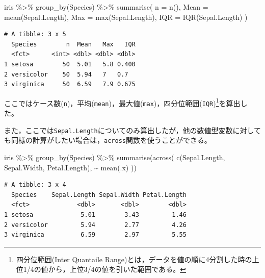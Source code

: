 \documentclass[
  a4paper,
]{ltjsbook}
\newenvironment{Shaded}{\begin{snugshade}}{\end{snugshade}}
\newcommand{\AttributeTok}[1]{\textcolor[rgb]{0.40,0.45,0.13}{#1}}
\newcommand{\FunctionTok}[1]{\textcolor[rgb]{0.28,0.35,0.67}{#1}}
\newcommand{\NormalTok}[1]{\textcolor[rgb]{0.00,0.23,0.31}{#1}}
\newcommand{\SpecialCharTok}[1]{\textcolor[rgb]{0.37,0.37,0.37}{#1}}
\begin{document}
\begin{Shaded}
\begin{Highlighting}[]
\NormalTok{iris }\SpecialCharTok{\%\textgreater{}\%}
  \FunctionTok{group\_by}\NormalTok{(Species) }\SpecialCharTok{\%\textgreater{}\%}
  \FunctionTok{summarise}\NormalTok{(}
    \AttributeTok{n =} \FunctionTok{n}\NormalTok{(),}
    \AttributeTok{Mean =} \FunctionTok{mean}\NormalTok{(Sepal.Length),}
    \AttributeTok{Max =} \FunctionTok{max}\NormalTok{(Sepal.Length),}
    \AttributeTok{IQR =} \FunctionTok{IQR}\NormalTok{(Sepal.Length)}
\NormalTok{  )}
\end{Highlighting}
\end{Shaded}

\begin{verbatim}
# A tibble: 3 x 5
  Species        n  Mean   Max   IQR
  <fct>      <int> <dbl> <dbl> <dbl>
1 setosa        50  5.01   5.8 0.400
2 versicolor    50  5.94   7   0.7  
3 virginica     50  6.59   7.9 0.675
\end{verbatim}

ここではケース数(\texttt{n})，平均(\texttt{mean})，最大値(\texttt{max})，四分位範囲(\texttt{IQR})\footnote{四分位範囲(Inter
  Quantaile
  Range)とは，データを値の順に4分割した時の上位1/4の値から，上位3/4の値を引いた範囲である。}を算出した。

また，ここでは\texttt{Sepal.Length}についてのみ算出したが，他の数値型変数に対しても同様の計算がしたい場合は，\texttt{across}関数を使うことができる。

\begin{Shaded}
\begin{Highlighting}[]
\NormalTok{iris }\SpecialCharTok{\%\textgreater{}\%}
  \FunctionTok{group\_by}\NormalTok{(Species) }\SpecialCharTok{\%\textgreater{}\%}
  \FunctionTok{summarise}\NormalTok{(}\FunctionTok{across}\NormalTok{(}
    \FunctionTok{c}\NormalTok{(Sepal.Length, Sepal.Width, Petal.Length),}
    \SpecialCharTok{\textasciitilde{}} \FunctionTok{mean}\NormalTok{(.x)}
\NormalTok{  ))}
\end{Highlighting}
\end{Shaded}

\begin{verbatim}
# A tibble: 3 x 4
  Species    Sepal.Length Sepal.Width Petal.Length
  <fct>             <dbl>       <dbl>        <dbl>
1 setosa             5.01        3.43         1.46
2 versicolor         5.94        2.77         4.26
3 virginica          6.59        2.97         5.55
\end{verbatim}
\end{document}
